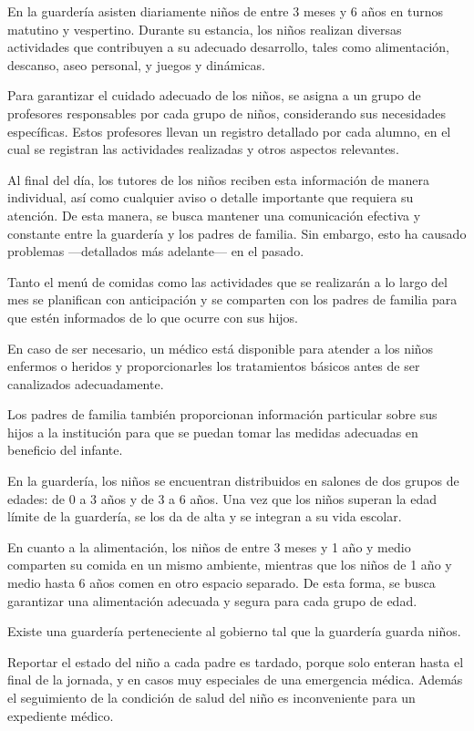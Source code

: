 \documentclass{article}
\begin{document}
En la guardería asisten diariamente niños de entre 3 meses y 6 años en turnos matutino y vespertino. Durante su estancia, los niños realizan diversas actividades que contribuyen a su adecuado desarrollo, tales como alimentación, descanso, aseo personal, y juegos y dinámicas.

Para garantizar el cuidado adecuado de los niños, se asigna a un grupo de profesores responsables por cada grupo de niños, considerando sus necesidades específicas. Estos profesores llevan un registro detallado por cada alumno, en el cual se registran las actividades realizadas y otros aspectos relevantes.

Al final del día, los tutores de los niños reciben esta información de manera individual, así como cualquier aviso o detalle importante que requiera su atención. De esta manera, se busca mantener una comunicación efectiva y constante entre la guardería y los padres de familia. Sin embargo, esto ha causado problemas ---detallados más adelante--- en el pasado.

Tanto el menú de comidas como las actividades que se realizarán a lo largo del mes se planifican con anticipación y se comparten con los padres de familia para que estén informados de lo que ocurre con sus hijos.

En caso de ser necesario, un médico está disponible para atender a los niños enfermos o heridos y proporcionarles los tratamientos básicos antes de ser canalizados adecuadamente.

Los padres de familia también proporcionan información particular sobre sus hijos a la institución para que se puedan tomar las medidas adecuadas en beneficio del infante.

En la guardería, los niños se encuentran distribuidos en salones de dos grupos de edades: de 0 a 3 años y de 3 a 6 años. Una vez que los niños superan la edad límite de la guardería, se los da de alta y se integran a su vida escolar.

En cuanto a la alimentación, los niños de entre 3 meses y 1 año y medio comparten su comida en un mismo ambiente, mientras que los niños de 1 año y medio hasta 6 años comen en otro espacio separado. De esta forma, se busca garantizar una alimentación adecuada y segura para cada grupo de edad.

Existe una guardería perteneciente al gobierno tal que la guardería guarda niños.

Reportar el estado del niño a cada padre es tardado, porque solo enteran hasta el final de la jornada, y en casos muy especiales de una emergencia médica. Además el seguimiento de la condición de salud del niño es inconveniente para un expediente médico.
\end{document}
